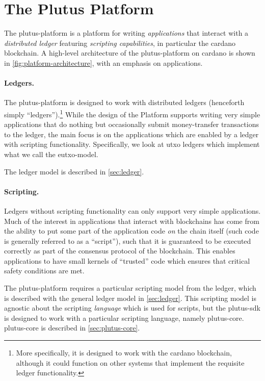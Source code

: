 \section{The Plutus Platform}

The \gls{plutus-platform} is a platform for writing \emph{applications} that interact with a \emph{distributed ledger} featuring \emph{scripting capabilities}, in particular the \gls{cardano} blockchain.
A high-level architecture of the \gls{plutus-platform} on \gls{cardano} is shown in \cref{fig:platform-architecture}, with an emphasis on applications.

\paragraph{Ledgers.}
The \gls{plutus-platform} is designed to work with distributed ledgers (henceforth simply ``ledgers'').\footnote{
More specifically, it is designed to work with the \gls{cardano} blockchain, although it could function on other systems that implement the requisite ledger functionality.
}
While the design of the Platform supports writing very simple applications that do nothing but occasionally submit money-transfer transactions to the ledger,
 the main focus is on the applications which are enabled by a ledger with scripting functionality.
Specifically, we look at \gls{utxo} ledgers which implement what we call the \gls{eutxo-model}.

The ledger model is described in \cref{sec:ledger}.

\paragraph{Scripting.}
Ledgers without scripting functionality can only support very simple applications.
Much of the interest in applications that interact with blockchains has come from the ability to put some part of the application code \emph{on} the chain itself (such code is generally referred to as a ``\gls{script}''), such that it is guaranteed to be executed correctly as part of the consensus protocol of the blockchain.
This enables applications to have small kernels of ``trusted'' code which ensures that critical safety conditions are met.

The \gls{plutus-platform} requires a particular scripting model from the ledger, which is described with the general ledger model in \cref{sec:ledger}.
This scripting model is agnostic about the scripting \emph{language} which is used for \glspl{script}, but the \gls{plutus-sdk} is designed to work with a particular scripting language, namely \gls{plutus-core}. \Gls{plutus-core} is described in \cref{sec:plutus-core}.

